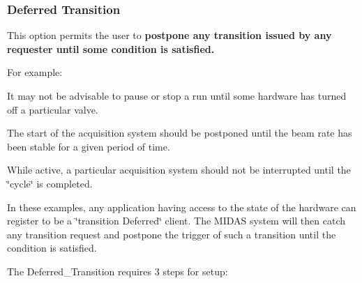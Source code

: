 \par


\par
 \label{FE_event_notification_idx_transition_deferred}
\hypertarget{FE_event_notification_idx_transition_deferred}{}
 \hypertarget{FE_event_notification_FE_Deferred_Transition}{}\subsubsection{Deferred Transition}\label{FE_event_notification_FE_Deferred_Transition}
This option permits the user to {\bfseries postpone any transition issued by any requester until some condition is satisfied.} \par
 For example:
\begin{DoxyItemize}
\item It may not be advisable to pause or stop a run until some hardware has turned off a particular valve.
\item The start of the acquisition system should be postponed until the beam rate has been stable for a given period of time.
\item While active, a particular acquisition system should not be interrupted until the \char`\"{}cycle\char`\"{} is completed.
\end{DoxyItemize}

In these examples, any application having access to the state of the hardware can register to be a \char`\"{}transition Deferred\char`\"{} client. The MIDAS system will then catch any transition request and postpone the trigger of such a transition until the condition is satisfied. \par
 The Deferred\_\-Transition requires 3 steps for setup:


